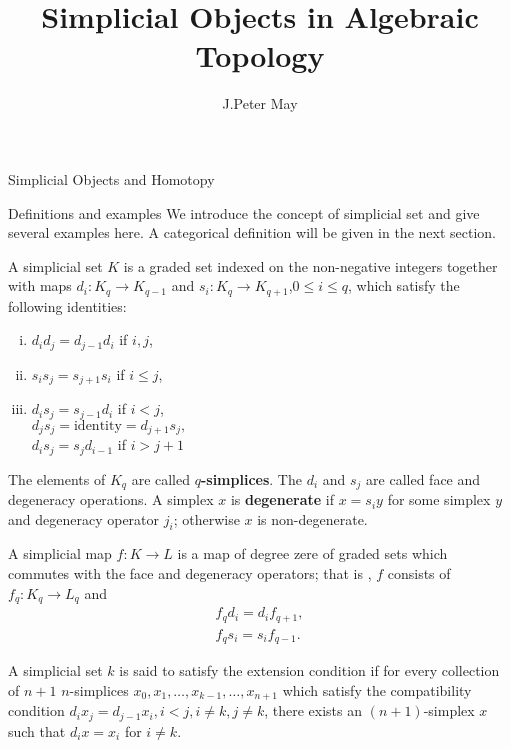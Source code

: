 \documentclass[a4,20pt,twosides]{book}
\begin{document}
\title{Simplicial Objects in Algebraic Topology}
\author{J.Peter May}
\maketitle
\tableofcontents
\begin{chapter}{Simplicial Objects and Homotopy}
\begin{section}{Definitions and examples}
We introduce the concept of simplicial set and give several examples here. A categorical definition will be given in the next section.
\begin{chdefn}
	\label{def1}
A simplicial set $K$ is a graded set indexed on the non-negative integers together with maps $d_i: K_q \rightarrow K_{q-1}$ and $s_i: K_q \rightarrow K_{q+1}$,$0 \leq i \leq q$, which satisfy the following identities:
	\begin{enumerate}[(i)]
		\item $d_{i} d_{j} =d_{j-1}d_{i}$ if $i ,j$,
		\item $s_i s_j = s_{j+1} s_i$ if $i \leq j$,
		\item $d_i s_j = s_{j-1} d_i$ if $i<j$,\\
		$d_j s_j = \text{identity} = d_{j+1} s_j,$\\
		$d_i s_j = s_j d_{i-1}$ if $ i > j+1$
	\end{enumerate}

The elements of $K_q$ are called \textbf{$q$-simplices}. The $d_i$ and $s_j$ are called face and degeneracy operations. A simplex $x$ is \textbf{degenerate} if $x=s_i y$ for some simplex $y$ and degeneracy operator $j_i$; otherwise $x$ is non-degenerate.
\end{chdefn}

\begin{chdefn}
	A simplicial map $f: K \rightarrow L$ is a map of degree zere of graded sets which commutes with the face and degeneracy operators; that is , $f$ consists of $f_q: K_q \rightarrow L_q$ and
	\[
		\begin{aligned}
		f_q d_i = d_i f_{q+1},\\
		f_q s_i = s_i f_{q-1}.
		\end{aligned}
	\] 
\end{chdefn}

\begin{chdefn}
	A simplicial set $k$ is said to satisfy the extension condition if for every collection of $n+1$ $n$-simplices $x_0,x_1,\dots,x_{k-1},\dots,x_{n+1}$ which satisfy the compatibility condition $d_i x_j = d_{j-1}x_{i}, i<j,i \neq k, j\neq k$, there exists an $(n+1)$-simplex $x$ such that $d_i x =x_i$ for $i \neq k$.
\end{chdefn}


\end{section}
\end{chapter}
\end{document}
